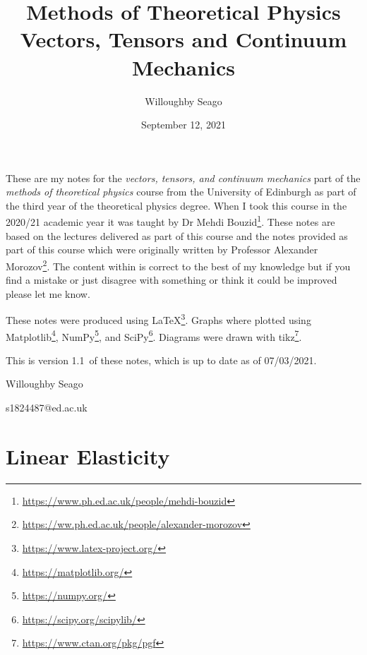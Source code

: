 \documentclass[a4paper]{article}
\author{Willoughby Seago}
\date{September 12, 2021}
\title{
    Methods of Theoretical Physics\\
    {\Large Vectors, Tensors and Continuum Mechanics}
}
\newcommand{\notesVersion}{1.1}
\newcommand{\notesDate}{07/03/2021}
\begin{document}
    \maketitle
    These are my notes for the \textit{vectors, tensors, and continuum mechanics} part of the \textit{methods of theoretical physics} course from the University of Edinburgh as part of the third year of the theoretical physics degree.
    When I took this course in the 2020/21 academic year it was taught by Dr Mehdi Bouzid\footnote{\url{https://www.ph.ed.ac.uk/people/mehdi-bouzid}}.
    These notes are based on the lectures delivered as part of this course and the notes provided as part of this course which were originally written by Professor Alexander Morozov\footnote{\url{https://ww.ph.ed.ac.uk/people/alexander-morozov}}.
    The content within is correct to the best of my knowledge but if you find a mistake or just disagree with something or think it could be improved please let me know.
    
    These notes were produced using \LaTeX\footnote{\url{https://www.latex-project.org/}}.
    Graphs where plotted using Matplotlib\footnote{\url{https://matplotlib.org/}}, NumPy\footnote{\url{https://numpy.org/}}, and SciPy\footnote{\url{https://scipy.org/scipylib/}}.
    Diagrams were drawn with tikz\footnote{\url{https://www.ctan.org/pkg/pgf}}.
    
    This is version \notesVersion~of these notes, which is up to date as of \notesDate.
    \begin{flushright}
        Willoughby Seago
        
        s1824487@ed.ac.uk
    \end{flushright}
    \clearpage
    \tableofcontents
    \listoffigures
    \printglossary[type=\acronymtype, title=Acronyms]
    \clearpage
    \begingroup
    \let\clearpage\relax  %
    
    \endgroup
    
    
    \part{Linear Elasticity}
\end{document}

